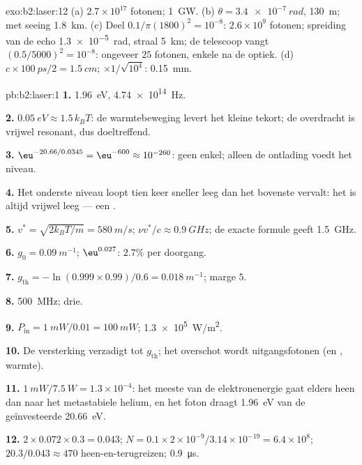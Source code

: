 \begin{solution}{exo:b2:laser:12}
(a) $2.7 \times 10^{17}$ fotonen; \qty{1}{GW}. (b) $\theta = \qty{3.4e-7}{rad}$,
\qty{130}{m}; met seeing \qty{1.8}{km}. (c) Deel
$0.1/\pi(1800)^2 =
10^{-8}$: $2.6 \times 10^9$ fotonen; spreiding van de
echo \qty{1.3e-5}{rad}, straal
\qty{5}{km}; de telescoop vangt $(0.5/5000)^2 = 10^{-8}$: ongeveer $25$
fotonen, enkele na de optiek. (d) $c \times \qty{100}{ps}/2 = \qty{1.5}{cm}$;
$\times 1/\sqrt{10^4}$: \qty{0.15}{mm}.
\end{solution}

\begin{solution}{pb:b2:laser:1}
\textbf{1.} \qty{1.96}{eV}, \qty{4.74e14}{Hz}.

\textbf{2.} $\qty{0.05}{eV} \approx 1.5\,k_BT$: de warmtebeweging levert
het kleine tekort; de overdracht is vrijwel resonant, dus doeltreffend.

\textbf{3.} $\eu^{-20.66/0.0345} = \eu^{-600} \approx 10^{-260}$: geen
enkel; alleen de
ontlading voedt het niveau.

\textbf{4.} Het onderste niveau loopt tien keer sneller leeg dan het bovenste
vervalt: het is altijd vrijwel leeg --- een .

\textbf{5.} $v^* = \sqrt{2k_BT/m} = \qty{580}{m/s}$;
$\nu v^*/c \approx \qty{0.9}{GHz}$;
de exacte formule geeft \qty{1.5}{GHz}.

\textbf{6.} $g_0 = \qty{0.09}{m^{-1}}$; $\eu^{0.027}$: $2.7\%$ per doorgang.

\textbf{7.} $g_{\text{th}} = -\ln(0.999 \times 0.99)/0.6 = \qty{0.018}{m^{-1}}$;
marge $5$.

\textbf{8.} \qty{500}{MHz}; drie.

\textbf{9.} $P_{\text{in}} = \qty{1}{mW}/0.01 = \qty{100}{mW}$; \qty{1.3e5}{W/m^2}.

\textbf{10.} De versterking verzadigt tot $g_{\text{th}}$; het overschot wordt
uitgangsfotonen (en , warmte).

\textbf{11.} $\qty{1}{mW}/\qty{7.5}{W} = 1.3 \times 10^{-4}$: het meeste van de
elektronenergie gaat elders heen dan naar het metastabiele helium, en het
foton draagt \qty{1.96}{eV} van de geïnvesteerde \qty{20.66}{eV}.

\textbf{12.} $2 \times 0.072 \times 0.3 = 0.043$;
$N = 0.1 \times 2 \times 10^{-9}/3.14
\times 10^{-19} = 6.4 \times 10^8$;
$20.3/0.043 \approx 470$ heen-en-terugreizen;
\qty{0.9}{\micro s}.


\end{solution}
